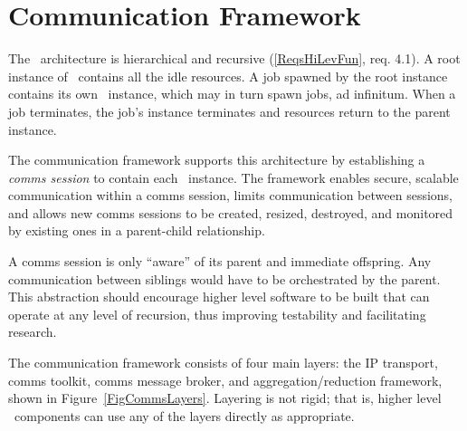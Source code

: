 \section{Communication Framework}\label{SecComms}

The \ngrm\ architecture is hierarchical and recursive
(\ref{ReqsHiLevFun}, req. 4.1).
A root instance of \ngrm\ contains all the
idle resources.  A job spawned by the root instance contains
its own \ngrm\ instance, which may in turn spawn jobs, ad infinitum.
When a job terminates, the job's instance terminates and resources
return to the parent instance.

The communication framework supports this architecture by
establishing a {\em comms session} to contain each \ngrm\ instance.
The framework enables secure, scalable communication
within a comms session, limits communication between sessions,
and allows new comms sessions to be created, resized, destroyed,
and monitored by existing ones in a parent-child relationship.

A comms session is only ``aware'' of its parent and immediate offspring.
Any communication between siblings would have to be orchestrated by
the parent.  This abstraction should encourage higher level software
to be built that can operate at any level of recursion, thus improving
testability and facilitating research.

The communication framework consists of four main layers:
the IP transport, comms toolkit, comms message broker, and
aggregation/reduction framework, shown
in Figure~\ref{FigCommsLayers}.  Layering is not rigid;
that is, higher level \ngrm\ components can use any of the
layers directly as appropriate.


